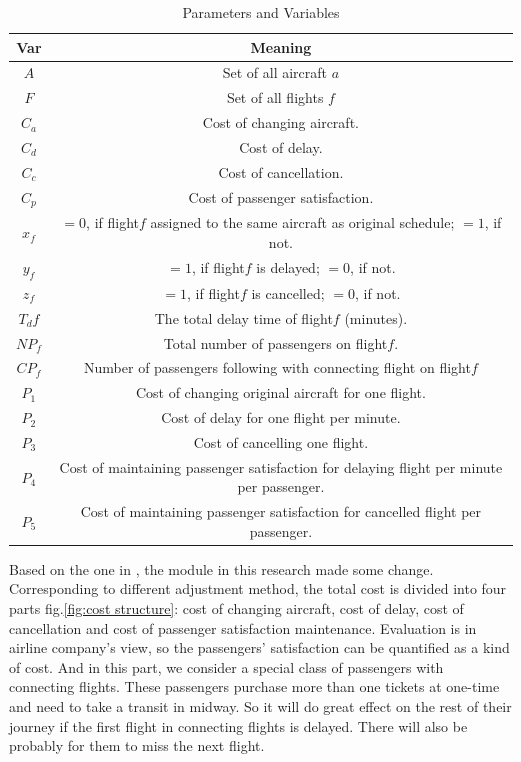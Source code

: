 \documentclass[senior]{IPSstyle}
\begin{document}
\begin{table}
\renewcommand{\arraystretch}{1.0}
\caption{Parameters and Variables}
\label{piriform_dataset}
\begin{center}
\begin{tabular}{|c|c|}
\hline
\multicolumn{1}{|c|}{Var}
&\multicolumn{1}{c|}{Meaning}
\\
\hline
\(A\)	&	Set of all aircraft \(a\)
\\	\hline
\(F\)	&	Set of all flights \(f\)
\\	\hline
\(C_a\) &   Cost of changing aircraft.
\\  \hline
\(C_d\) &   Cost of delay.
\\  \hline
\(C_c\) &   Cost of cancellation.
\\  \hline
\(C_p\) &   Cost of passenger satisfaction.
\\  \hline
\(x_f\)	&   \(=0\), if flight\(f\) assigned to the same aircraft as original schedule; \(=1\), if not.
\\	\hline
\(y_f\) &   \(=1\), if flight\(f\) is delayed; \(=0\), if not.
\\  \hline
\(z_f\) &   \(=1\), if flight\(f\) is cancelled; \(=0\), if not.
\\  \hline
\(T_df\) &   The total delay time of flight\(f\) (minutes).
\\  \hline
\(NP_f\) &  Total number of passengers on flight\(f\).
\\  \hline
\(CP_f\) &   Number of passengers following with connecting flight on flight\(f\)
\\  \hline
\(P_1\) &   Cost of changing original aircraft for one flight.
\\  \hline
\(P_2\) &   Cost of delay for one flight per minute.
\\  \hline
\(P_3\) &   Cost of cancelling one flight.
\\  \hline
\(P_4\) &   Cost of maintaining passenger satisfaction for delaying flight per minute per passenger.
\\  \hline
\(P_5\) &   Cost of  maintaining passenger satisfaction for cancelled flight per passenger.
\\  \hline
\end{tabular}
\end{center}
\end{table}

Based on the one in \cite{sousa2015airline}, the module in this research made some change. Corresponding to different adjustment method, the total cost is divided into four parts fig.\ref{fig:cost structure}: cost of changing aircraft, cost of delay, cost of cancellation and cost of passenger satisfaction maintenance. Evaluation is in airline company’s view, so the passengers’ satisfaction can be quantified as a kind of cost. And in this part, we consider a special class of passengers with connecting flights. These passengers purchase more than one tickets at one-time and need to take a transit in midway. So it will do great effect on the rest of their journey if the first flight in connecting flights is delayed. There will also be probably for them to miss the next flight. 
\end{document}
